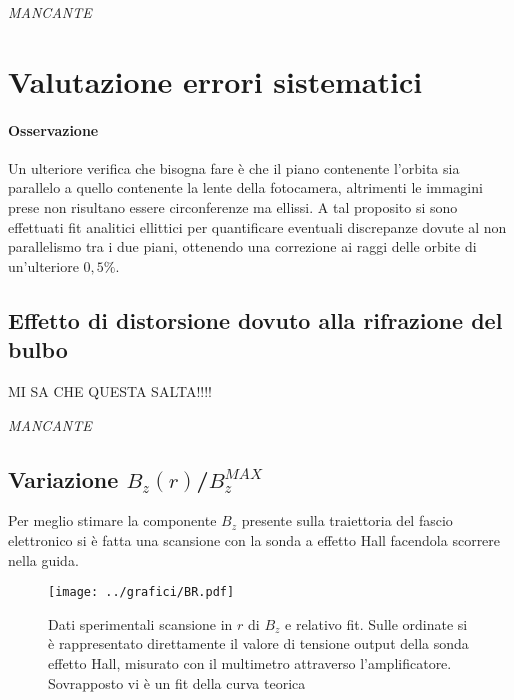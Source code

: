 \documentclass[10pt,a4paper]{article}
\begin{document}


\emph{MANCANTE}

\section{Valutazione errori sistematici}

\paragraph{Osservazione}
Un ulteriore verifica che bisogna fare è che il piano contenente l'orbita sia parallelo a quello contenente la lente della fotocamera, altrimenti le immagini prese non risultano essere circonferenze ma ellissi. A tal proposito si sono effettuati fit analitici ellittici per quantificare eventuali discrepanze dovute al non parallelismo tra i due piani, ottenendo una correzione ai raggi delle orbite di un'ulteriore $0,5\%$.

\subsection{Effetto di distorsione dovuto alla rifrazione del bulbo}
MI SA CHE QUESTA SALTA!!!!

\emph{MANCANTE}

\subsection{Variazione $B_z(r)$/$B_z^{MAX}$}

Per meglio stimare la componente $B_z$ presente sulla traiettoria del fascio elettronico si è fatta una scansione con la sonda a effetto Hall facendola scorrere nella guida. 

\begin{figure}[h!]
	\centering
	\texttt{[image: ../grafici/BR.pdf]}
	\caption{Dati sperimentali scansione in $r$ di $B_z$ e relativo fit. Sulle ordinate si è rappresentato direttamente il valore di tensione output della sonda effetto Hall, misurato con il multimetro attraverso l'amplificatore. Sovrapposto vi è un fit della curva teorica}
	\label{BR}
\end{figure}
\end{document}

